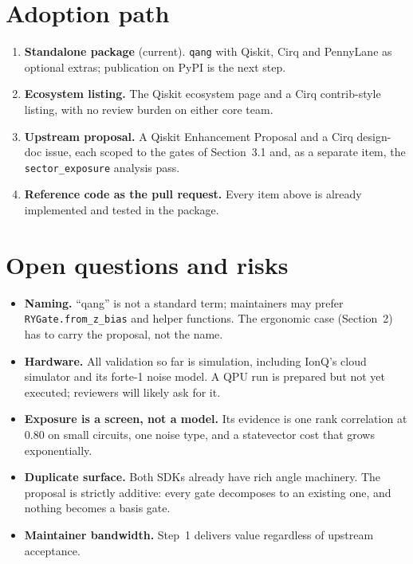 \documentclass[11pt]{article}
\begin{document}
\section{Adoption path}

\begin{enumerate}
\item \textbf{Standalone package} (current). \texttt{qang} with Qiskit, Cirq and PennyLane as optional
extras; publication on PyPI is the next step.
\item \textbf{Ecosystem listing.} The Qiskit ecosystem page and a Cirq contrib-style listing, with no
review burden on either core team.
\item \textbf{Upstream proposal.} A Qiskit Enhancement Proposal and a Cirq design-doc issue, each
scoped to the gates of Section~3.1 and, as a separate item, the \texttt{sector\_exposure} analysis pass.
\item \textbf{Reference code as the pull request.} Every item above is already implemented and tested in
the package.
\end{enumerate}

\section{Open questions and risks}

\begin{itemize}
\item \textbf{Naming.} ``qang'' is not a standard term; maintainers may prefer
\texttt{RYGate.from\_z\_bias} and helper functions. The ergonomic case (Section~2) has to carry the
proposal, not the name.
\item \textbf{Hardware.} All validation so far is simulation, including IonQ's cloud simulator and its
forte-1 noise model. A QPU run is prepared but not yet executed; reviewers will likely ask for it.
\item \textbf{Exposure is a screen, not a model.} Its evidence is one rank correlation at 0.80 on small
circuits, one noise type, and a statevector cost that grows exponentially.
\item \textbf{Duplicate surface.} Both SDKs already have rich angle machinery. The proposal is strictly
additive: every gate decomposes to an existing one, and nothing becomes a basis gate.
\item \textbf{Maintainer bandwidth.} Step~1 delivers value regardless of upstream acceptance.
\end{itemize}



\end{document}
